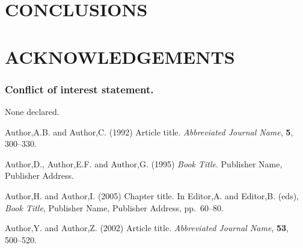 \documentclass[a4,center,fleqn]{NAR}
\begin{document}


\section{CONCLUSIONS}

\section{ACKNOWLEDGEMENTS}


\subsubsection{Conflict of interest statement.} None declared.
\newpage


\begin{thebibliography}{4}

Author,A.B. and Author,C. (1992)
Article title.
\textit{Abbreviated Journal Name}, \textbf{5}, 300--330.

Author,D., Author,E.F. and Author,G. (1995)
\textit{Book Title}.
Publisher Name, Publisher Address.

Author,H. and Author,I. (2005)
Chapter title.
In
Editor,A. and Editor,B. (eds),
\textit{Book Title},
Publisher Name, Publisher Address,
pp.\ 60--80.

Author,Y. and Author,Z. (2002)
Article title.
\textit{Abbreviated Journal Name}, \textbf{53}, 500--520.

\end{thebibliography}
\end{document}
